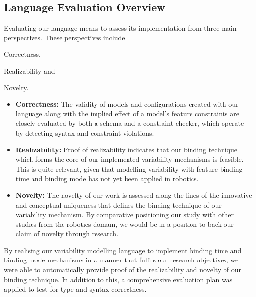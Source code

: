 \documentclass[conference]{IEEEtran}
\begin{document}
\subsection{Language Evaluation Overview}
Evaluating our language means to assess its implementation from three main perspectives. These perspectives include \begin{enumerate*}[label=(\roman*)]
\item Correctness,
\item Realizability and
\item Novelty.
\end{enumerate*}
\begin{itemize}
    \item \textbf{Correctness:} The validity of models and configurations created with our language along with the implied effect of a model's feature constraints are closely evaluated by both a schema and a constraint checker, which operate by detecting syntax and constraint violations.
    
    \item \textbf{Realizability:} Proof of realizability indicates that our binding technique which forms the core of our implemented variability mechanisms is feasible. This is quite relevant, given that modelling variability with feature binding time and binding mode has not yet been applied in robotics.
    
    \item \textbf{Novelty:} The novelty of our work is assessed along the lines of the innovative and conceptual uniqueness that defines the binding technique of our variability mechanism. By comparative positioning our study with other studies from the robotics domain, we would be in a position to back our claim of novelty through research.
\end{itemize}

By realising our variability modelling language to implement binding time and binding mode mechanisms in a manner that fulfils our research objectives, we were able to automatically provide proof of the realizability and novelty of our binding technique. In addition to this, a comprehensive evaluation plan was applied to test for type and syntax correctness.
\end{document}
